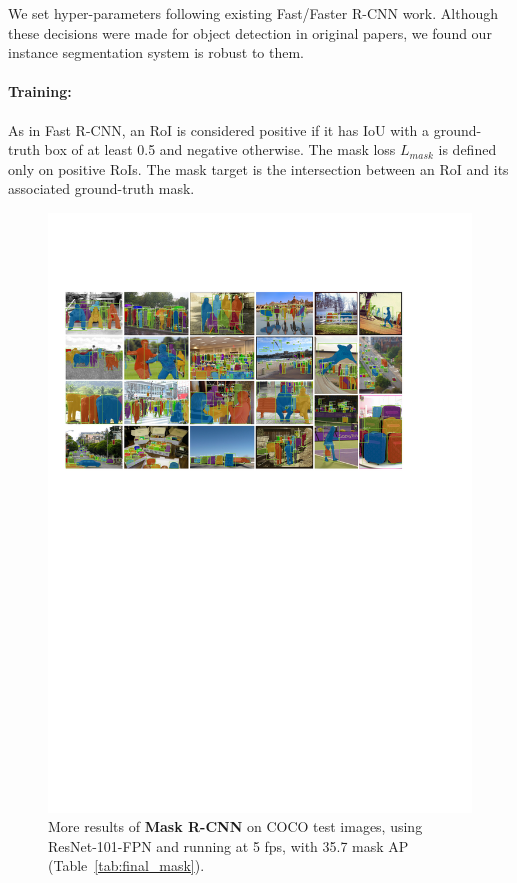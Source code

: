 \label{sec:impl}

We set hyper-parameters following existing Fast/Faster R-CNN work. Although these decisions were made for object detection in original papers, we found our instance segmentation system is robust to them.

\paragraph{Training:} As in Fast R-CNN, an RoI is considered positive if it has IoU with a ground-truth box of at least 0.5 and negative otherwise. The mask loss $L_{mask}$ is defined only on positive RoIs. The mask target is the intersection between an RoI and its associated ground-truth mask.

\begin{figure}[t]
\centering
\includegraphics[width=1.0\linewidth]{figures/mask_rcnn/results_more}
\caption{More results of \textbf{Mask R-CNN} on COCO test images, using ResNet-101-FPN and running at 5 fps, with 35.7 mask AP (Table~\ref{tab:final_mask}).}
\label{fig:results_more}
\end{figure}

